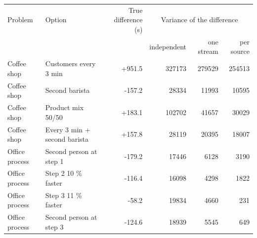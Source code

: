 \begin{tabular}{llrrrr}
\toprule
Problem & Option & True difference (s) & \multicolumn{3}{c}{Variance of the difference} \\
 & & & independent & one stream & per source \\
\midrule
Coffee shop & Customers every 3 min & +951.5 & 327173 & 279529 & 254513 \\
Coffee shop & Second barista & -157.2 & 28334 & 11993 & 10595 \\
Coffee shop & Product mix 50/50 & +183.1 & 102702 & 41657 & 30029 \\
Coffee shop & Every 3 min + second barista & +157.8 & 28119 & 20395 & 18007 \\
Office process & Second person at step 1 & -179.2 & 17446 & 6128 & 3190 \\
Office process & Step 2 10 \% faster & -116.4 & 16098 & 4298 & 1822 \\
Office process & Step 3 11 \% faster & -58.2 & 19834 & 4660 & 231 \\
Office process & Second person at step 3 & -124.6 & 18939 & 5545 & 649 \\
\bottomrule
\end{tabular}
